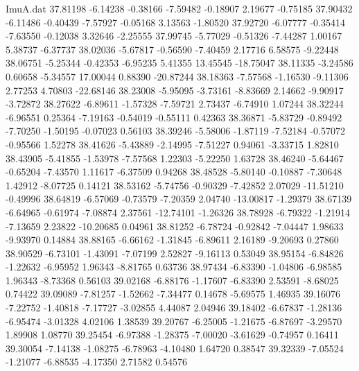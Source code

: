 \begin{filecontents}{ImuA.dat}
  37.81198   -6.14238   -0.38166   -7.59482   -0.18907    2.19677   -0.75185
  37.90432   -6.11486   -0.40439   -7.57927   -0.05168    3.13563   -1.80520
  37.92720   -6.07777   -0.35414   -7.63550   -0.12038    3.32646   -2.25555
  37.99745   -5.77029   -0.51326   -7.44287    1.00167    5.38737   -6.37737
  38.02036   -5.67817   -0.56590   -7.40459    2.17716    6.58575   -9.22448
  38.06751   -5.25344   -0.42353   -6.95235    5.41355   13.45545  -18.75047
  38.11335   -3.24586    0.60658   -5.34557   17.00044    0.88390  -20.87244
  38.18363   -7.57568   -1.16530   -9.11306    2.77253    4.70803  -22.68146
  38.23008   -5.95095   -3.73161   -8.83669    2.14662   -9.90917   -3.72872
  38.27622   -6.89611   -1.57328   -7.59721    2.73437   -6.74910    1.07244
  38.32244   -6.96551    0.25364   -7.19163   -0.54019   -0.55111    0.42363
  38.36871   -5.83729   -0.89492   -7.70250   -1.50195   -0.07023    0.56103
  38.39246   -5.58006   -1.87119   -7.52184   -0.57072   -0.95566    1.52278
  38.41626   -5.43889   -2.14995   -7.51227    0.94061   -3.33715    1.82810
  38.43905   -5.41855   -1.53978   -7.57568    1.22303   -5.22250    1.63728
  38.46240   -5.64467   -0.65204   -7.43570    1.11617   -6.37509    0.94268
  38.48528   -5.80140   -0.10887   -7.30648    1.42912   -8.07725    0.14121
  38.53162   -5.74756   -0.90329   -7.42852    2.07029  -11.51210   -0.49996
  38.64819   -6.57069   -0.73579   -7.20359    2.04740  -13.00817   -1.29379
  38.67139   -6.64965   -0.61974   -7.08874    2.37561  -12.74101   -1.26326
  38.78928   -6.79322   -1.21914   -7.13659    2.23822  -10.20685    0.04961
  38.81252   -6.78724   -0.92842   -7.04447    1.98633   -9.93970    0.14884
  38.88165   -6.66162   -1.31845   -6.89611    2.16189   -9.20693    0.27860
  38.90529   -6.73101   -1.43091   -7.07199    2.52827   -9.16113    0.53049
  38.95154   -6.84826   -1.22632   -6.95952    1.96343   -8.81765    0.63736
  38.97434   -6.83390   -1.04806   -6.98585    1.96343   -8.73368    0.56103
  39.02168   -6.88176   -1.17607   -6.83390    2.53591   -8.68025    0.74422
  39.09089   -7.81257   -1.52662   -7.34477    0.14678   -5.69575    1.46935
  39.16076   -7.22752   -1.40818   -7.17727   -3.02855    4.44087    2.04946
  39.18402   -6.67837   -1.28136   -6.95474   -3.01328    4.02106    1.38539
  39.20767   -6.25005   -1.21675   -6.87697   -3.29570    1.89908    1.08770
  39.25454   -6.97388   -1.28375   -7.00020   -3.61629   -0.74957    0.16411
  39.30054   -7.14138   -1.08275   -6.78963   -4.10480    1.64720    0.38547
  39.32339   -7.05524   -1.21077   -6.88535   -4.17350    2.71582    0.54576

\end{filecontents}
